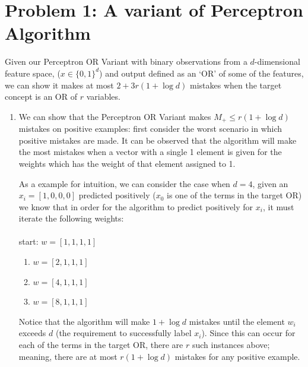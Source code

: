 \documentclass[twoside,11pt]{homework}
\date{\today}
\DeclarePairedDelimiter{\2norm}{\lVert}{\rVert^2_2}
\newcommand{\1}[1]{\mathds{1}\left[#1\right]}
\begin{document}
\maketitle

\section*{Problem 1: A variant of Perceptron Algorithm}
Given our Perceptron OR Variant with binary observations from a $d$-dimensional
feature space, ($x \in \{0, 1\}^{d}$) and output defined as an `OR' of some of the
features, we can show it makes at most $2 + 3r(1+\log d)$ mistakes when the
target concept is an OR of $r$ variables.
\begin{enumerate}[\bf (i)]   
	\item
	We can show that the Perceptron OR Variant makes $M_{+}\leq r(1+ \log d)$
	mistakes on positive examples:
	first consider the worst scenario in which positive mistakes are made. It
	can be observed that the algorithm will make the most mistakes when a vector
	with a single 1 element is given for the weights which has the weight of
	that element assigned to 1.
	
	As a example for intuition, we can consider the case when $d = 4$, given
	an $x_{i}=[1,0,0,0]$ predicted positively ($x_{0}$ is one of the terms in
	the target OR) we know that in order for the algorithm to predict positively
	for $x_{i}$, it must iterate the following weights:  \\ \\
	start: $w = [1,1,1,1]$
	\begin{enumerate}[(1)]
		\item
		$w = [2,1,1,1]$
		\item
		$w = [4,1,1,1]$
		\item
		$w = [8,1,1,1]$
	\end{enumerate}
	Notice that the algorithm will make $1 + \log d$ mistakes until the element
	$w_{i}$ exceeds $d$ (the requirement to successfully label $x_{i}$). Since
	this can occur for each of the terms in the target OR, there are $r$ such
	instances above; meaning, there are at most $r(1 + \log d)$ mistakes for any
	positive example.
	

\end{enumerate}
\end{document}

